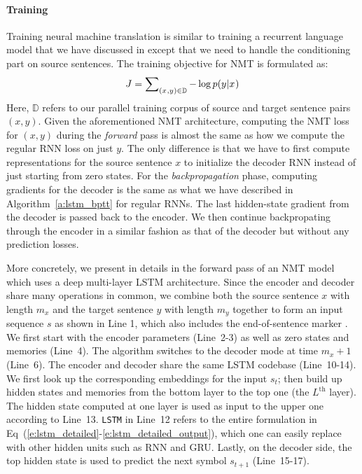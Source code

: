 \paragraph{Training}
Training neural machine translation is similar to training a recurrent
language model that we have discussed in  except that we need to
handle the conditioning part on source sentences.
The training objective for NMT is formulated as:
\begin{equation}
J = \sum_{(x_{},y_{}) \in \mathbb{D}} \nolimits -\log p(y_{}|x_{})
\label{e:j_t}
\end{equation}
Here, $\mathbb{D}$ refers to our parallel training corpus of source and target
sentence pairs $(x, y)$. Given the aforementioned NMT architecture,
computing the NMT loss for $(x, y)$ during the {\it forward} pass is
almost the same as how we compute the regular RNN loss on just $y$.
The only difference is that we have to first compute representations for the source
sentence $x$ to initialize the decoder RNN instead of just starting
from zero states. For the {\it backpropagation} phase, computing gradients for
the decoder is the same as what we have described in
Algorithm~\ref{a:lstm_bptt} for regular RNNs. The last hidden-state gradient
from the decoder is
passed back to the encoder. We then continue backpropating through the encoder
in a similar fashion as that of the decoder but without any prediction losses.

More concretely, we present in
 details in the forward pass of an NMT model which uses
a deep multi-layer LSTM architecture. Since the encoder and decoder share
many operations in common, we combine both the source sentence $x$ with length
$m_x$ and the target sentence $y$ with length $m_y$ together to form an input
sequence $s$ as shown in Line 1, which also includes the end-of-sentence marker
\word{\_}. We first start with the encoder parameters (Line~2-3) as well as zero
states and memories (Line~4). The algorithm switches to the decoder mode at time
$m_x + 1$ (Line~6). The encoder and decoder share the same LSTM codebase
(Line~10-14). We first look up the corresponding embeddings for the input
$s_t$; then build up hidden states and memories from the bottom layer to the top
one (the $L^{\text{th}}$ layer). The hidden state computed at one layer is used
as input to the upper one according to Line~13. \texttt{LSTM} in Line~12 refers
to the entire formulation in
Eq~(\ref{e:lstm_detailed}-\ref{e:lstm_detailed_output}), which one can easily
replace with other hidden units such as RNN and GRU. Lastly, on the decoder
side, the top hidden state is used to predict the next symbol $s_{t+1}$
(Line~15-17).

